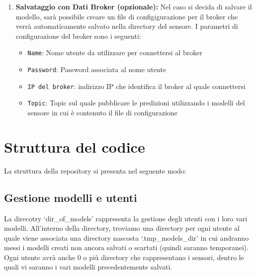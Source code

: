\documentclass[a4paper,10pt]{article}
\begin{document}
\begin{enumerate}
  \item \textbf{Salvataggio con Dati Broker (opzionale):} Nel caso si decida di salvare il modello, sarà possibile creare un file di configigurazione 
  per il broker che verrà automaticamente salvato nella directory del sensore.  I parametri di configurazione del broker sono i seguenti:
  
  \begin{itemize}
    \item \texttt{Name}: Nome utente da utilizzare per connettersi al broker
    \item \texttt{Password}: Password associata al nome utente
    \item \texttt{IP del broker}: indirizzo IP che identifica il broker al quale connettersi
    \item \texttt{Topic}: Topic sul quale pubblicare le predizioni utilizzando i modelli del sensore in cui è contenuto il file di configurazione
  \end{itemize}
\end{enumerate}

\section{Struttura del codice}
La struttura della repository si presenta nel seguente modo:


\subsection{Gestione modelli e utenti}
La direcotry `dir\_of\_models' rappresenta la gestione degli utenti con i loro vari modelli.
All'interno della directory, troviamo una directory per ogni utente al quale viene associata una directory nascosta 
`.tmp\_models\_dir' in cui andranno messi i modelli creati non ancora salvati o scartati (quindi saranno temporanei).
Ogni utente avrà anche 0 o più directory che rappresentano i sensori, dentro le quali vi saranno i vari modelli precedentemente salvati.
\end{document}
